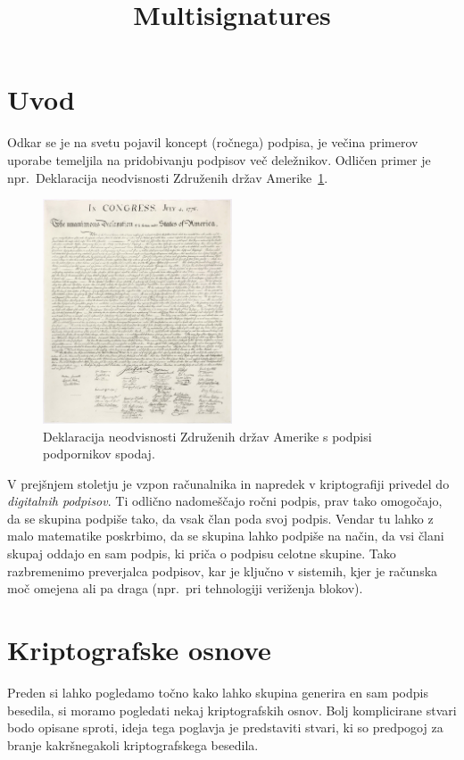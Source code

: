 \documentclass[isrm2, tisk]{fmfdelo}
\title{Multisignatures}
\begin{document}
\section{Uvod}
Odkar se je na svetu pojavil koncept (ročnega) podpisa, je večina primerov uporabe temeljila na
pridobivanju podpisov več deležnikov. Odličen primer je npr.\ Deklaracija neodvisnosti Združenih 
držav Amerike~\ref{fig:declaration}. 

\begin{figure}[h]
  \centering
  \includegraphics[width=0.5\textwidth]{images/declaration.jpg}
  \caption[Deklaracija neodvisnosti Združenih držav Amerike.]{Deklaracija neodvisnosti Združenih 
  držav Amerike s podpisi podpornikov spodaj.}
  \label{fig:declaration}
\end{figure}

V prejšnjem stoletju je vzpon računalnika in napredek v kriptografiji privedel do \textit{digitalnih
podpisov}. Ti odlično nadomeščajo ročni podpis, prav tako omogočajo, da se skupina podpiše tako, 
da vsak član poda svoj podpis. Vendar tu lahko z malo matematike poskrbimo, da se skupina lahko 
podpiše na način, da vsi člani skupaj oddajo en sam podpis, ki priča o podpisu celotne skupine. Tako 
razbremenimo preverjalca podpisov, kar je ključno v sistemih, kjer je računska moč omejena ali 
pa draga (npr.\ pri tehnologiji veriženja blokov).

\section{Kriptografske osnove}
Preden si lahko pogledamo točno kako lahko skupina generira en sam podpis besedila, si moramo 
pogledati nekaj kriptografskih osnov. Bolj komplicirane stvari bodo opisane sproti, ideja tega 
poglavja je predstaviti stvari, ki so predpogoj za branje kakršnegakoli kriptografskega 
besedila.
\end{document}
